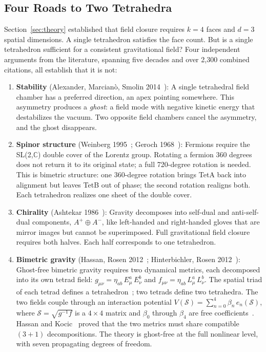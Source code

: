 \documentclass[aps,prd,preprint,superscriptaddress,showpacs,preprintnumbers,amsmath,amssymb,nofootinbib]{revtex4-2}
\begin{document}
\subsection{Four Roads to Two Tetrahedra}
\label{subsec:two-tet}

Section~\ref{sec:theory} established that field closure requires $k = 4$ faces and $d = 3$ spatial dimensions. A single tetrahedron satisfies the face count. But is a single tetrahedron sufficient for a consistent gravitational field? Four independent arguments from the literature, spanning five decades and over 2,300 combined citations, all establish that it is not:

\begin{enumerate}
\item \textbf{Stability} (Alexander, Marcian\`o, Smolin 2014~\cite{alexander2014}): A single tetrahedral field chamber has a preferred direction, an apex pointing somewhere. This asymmetry produces a \emph{ghost}: a field mode with negative kinetic energy that destabilizes the vacuum. Two opposite field chambers cancel the asymmetry, and the ghost disappears.

\item \textbf{Spinor structure} (Weinberg 1995~\cite{weinberg1995}; Geroch 1968~\cite{geroch1968}): Fermions require the SL(2,$\mathbb{C}$) double cover of the Lorentz group. Rotating a fermion 360 degrees does not return it to its original state; a full 720-degree rotation is needed. This is bimetric structure: one 360-degree rotation brings TetA back into alignment but leaves TetB out of phase; the second rotation realigns both. Each tetrahedron realizes one sheet of the double cover.

\item \textbf{Chirality} (Ashtekar 1986~\cite{ashtekar1986}): Gravity decomposes into self-dual and anti-self-dual components, $A^+ \oplus A^-$, like left-handed and right-handed gloves that are mirror images but cannot be superimposed. Full gravitational field closure requires both halves. Each half corresponds to one tetrahedron.

\item \textbf{Bimetric gravity} (Hassan, Rosen 2012~\cite{hassan2012}; Hinterbichler, Rosen 2012~\cite{hinterbichler2012}): Ghost-free bimetric gravity requires two dynamical metrics, each decomposed into its own tetrad field: $g_{\mu\nu} = \eta_{ab}\,E^a_\mu\,E^b_\nu$ and $f_{\mu\nu} = \eta_{ab}\,L^a_\mu\,L^b_\nu$. The spatial triad of each tetrad defines a tetrahedron~\cite{barbieri1998}; two tetrads define two tetrahedra. The two fields couple through an interaction potential $V(\mathcal{S}) = \sum_{n=0}^{4} \beta_n\,e_n(\mathcal{S})$, where $\mathcal{S} = \sqrt{g^{-1}f}$ is a $4 \times 4$ matrix and $\beta_0$ through $\beta_4$ are free coefficients~\cite{hassan2012}. Hassan and Kocic~\cite{hassankocic2018} proved that the two metrics must share compatible $(3{+}1)$ decompositions. The theory is ghost-free at the full nonlinear level, with seven propagating degrees of freedom.
\end{enumerate}
\end{document}
